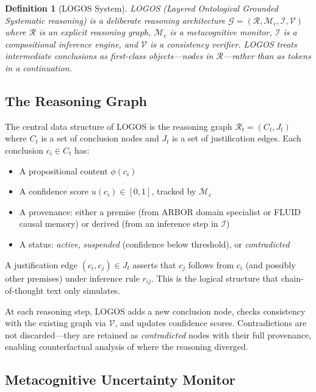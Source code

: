 \documentclass[12pt]{article}
\newtheorem{definition}{Definition}
\begin{document}
\begin{definition}[LOGOS System]
LOGOS (Layered Ontological Grounded Systematic reasoning) is a deliberate reasoning architecture $\mathcal{G} = (\mathcal{R}, \mathcal{M}_c, \mathcal{I}, \mathcal{V})$ where $\mathcal{R}$ is an explicit reasoning graph, $\mathcal{M}_c$ is a metacognitive monitor, $\mathcal{I}$ is a compositional inference engine, and $\mathcal{V}$ is a consistency verifier. LOGOS treats intermediate conclusions as first-class objects---nodes in $\mathcal{R}$---rather than as tokens in a continuation.
\end{definition}

\subsection{The Reasoning Graph}

The central data structure of LOGOS is the reasoning graph $\mathcal{R}_t = (C_t, J_t)$ where $C_t$ is a set of conclusion nodes and $J_t$ is a set of justification edges. Each conclusion $c_i \in C_t$ has:
\begin{itemize}
    \item A propositional content $\phi(c_i)$
    \item A confidence score $u(c_i) \in [0, 1]$, tracked by $\mathcal{M}_c$
    \item A provenance: either a premise (from ARBOR domain specialist or FLUID causal memory) or derived (from an inference step in $\mathcal{I}$)
    \item A status: \textit{active}, \textit{suspended} (confidence below threshold), or \textit{contradicted}
\end{itemize}

A justification edge $(c_i, c_j) \in J_t$ asserts that $c_j$ follows from $c_i$ (and possibly other premises) under inference rule $r_{ij}$. This is the logical structure that chain-of-thought text only simulates.

At each reasoning step, LOGOS adds a new conclusion node, checks consistency with the existing graph via $\mathcal{V}$, and updates confidence scores. Contradictions are not discarded---they are retained as \textit{contradicted} nodes with their full provenance, enabling counterfactual analysis of where the reasoning diverged.

\subsection{Metacognitive Uncertainty Monitor}
\end{document}
